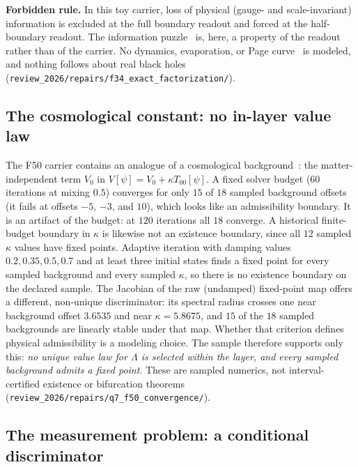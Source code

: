 \textbf{Forbidden rule.} In this toy carrier, loss of physical (gauge- and scale-invariant) information is excluded at
the full boundary readout and forced at the half-boundary readout. The information puzzle~\citep{Hawking1976} is, here,
a property of the readout rather than of the carrier. No dynamics, evaporation, or Page curve~\citep{Page1993} is
modeled, and nothing follows about real black holes (\nolinkurl{review_2026/repairs/f34_exact_factorization/}).



\subsection{The cosmological constant: no in-layer value law}\label{the-cosmological-constant-no-in-layer-value-law}

The F50 carrier contains an analogue of a cosmological background~\citep{Weinberg1989}: the matter-independent term
\(V_0\) in \(V[\psi]=V_0+\kappa T_{00}[\psi]\). A fixed solver budget (\(60\) iterations at mixing \(0.5\)) converges for
only \(15\) of \(18\) sampled background offsets (it fails at offsets \(-5\), \(-3\), and \(10\)), which looks like an
admissibility boundary. It is an artifact of the budget: at \(120\) iterations all \(18\) converge. A historical
finite-budget boundary in \(\kappa\) is likewise not an existence boundary, since all \(12\) sampled \(\kappa\) values have
fixed points. Adaptive iteration with damping values \(0.2,0.35,0.5,0.7\) and at least three initial states finds a fixed point
for every sampled background and every sampled \(\kappa\), so there is no existence boundary on the declared sample. The
Jacobian of the raw (undamped) fixed-point map offers a different, non-unique discriminator: its spectral radius crosses
one near background offset \(3.6535\) and near \(\kappa=5.8675\), and \(15\) of the \(18\) sampled backgrounds are linearly
stable under that map. Whether that criterion defines physical admissibility is a modeling
choice. The sample therefore supports only this: \emph{no unique value law for \(\Lambda\) is selected within the layer,
and every sampled background admits a fixed point}. These are sampled numerics, not interval-certified existence or
bifurcation theorems (\nolinkurl{review_2026/repairs/q7_f50_convergence/}).

\subsection{The measurement problem: a conditional discriminator}\label{the-measurement-problem-a-structural-discriminator}

